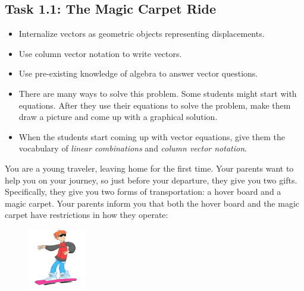 \documentclass{problemset}
\begin{document}
\begin{iola}
\section*{Task 1.1: The Magic Carpet Ride}


\begin{annotation}
	\begin{goals}
		\begin{itemize}
			\item Internalize vectors as geometric objects representing
				displacements.

			\item Use column vector notation to write vectors.

			\item Use pre-existing knowledge of algebra to answer vector
				questions.
		\end{itemize}
	\end{goals}
	\begin{notes}

		\begin{itemize}
			\item There are many ways to solve this problem.
				Some students
				might start with equations. After they use their
				equations to solve the problem, make them draw a picture
				and come up with a graphical solution.

			\item When the students start coming up with vector equations,
				give them the vocabulary of \emph{linear
				combinations}
				and \emph{column vector notation}.
		\end{itemize}
	\end{notes}
\end{annotation}
You are a young traveler, leaving home for the first time. Your parents
want to help you on your journey, so just before your departure, they give you two
gifts. Specifically, they give you two forms of transportation: a hover board and
a magic carpet. Your parents inform you that both the hover board and the magic carpet
have restrictions in how they operate:

\begin{minipage}{\textwidth}
	\vspace{.5cm}
	\begin{figure}
	\vspace{-.8cm}
	\includegraphics[width=1in]{images/HoverBoard-small.png}
	\end{figure}


\end{minipage}
\end{iola}
\end{document}
